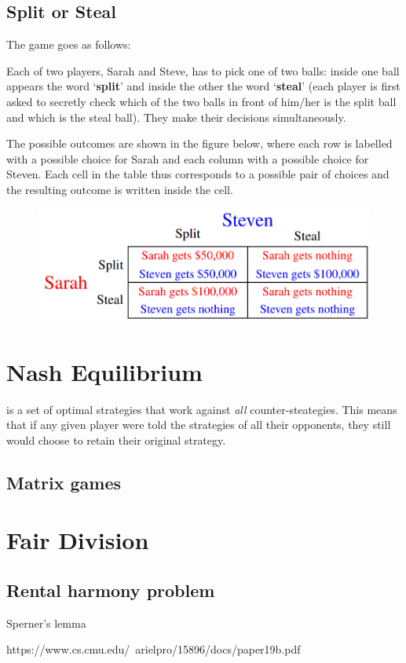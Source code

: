 \subsection{Split or Steal}
The game goes as follows:
\begin{ebox}
Each of two players, Sarah and Steve, has to pick one of two balls: inside one ball appears the word ‘\textbf{split}’ and inside the other the word ‘\textbf{steal}’ (each player is first asked to secretly check which of the two balls in front of him/her is the split ball and which is the steal ball). They make their decisions simultaneously. 
\end{ebox}

The possible outcomes are shown in the figure below, where each row is labelled with a possible choice for Sarah and each column with a possible choice for Steven. Each cell in the table thus corresponds to a possible pair of choices and the resulting outcome is written inside the cell.

\begin{figure}[H]
    \centering
    \includegraphics[width=12cm]{images/Split_or_steal.png}
\end{figure}

\section{Nash Equilibrium}
 is a set of optimal strategies that work against \textit{all} counter-steategies. This means that if any given player were told the strategies of all their opponents, they still would choose to retain their original strategy. 

\subsection{Matrix games}

\section{Fair Division}
\subsection{Rental harmony problem}
Sperner's lemma

https://www.cs.cmu.edu/~arielpro/15896/docs/paper19b.pdf
